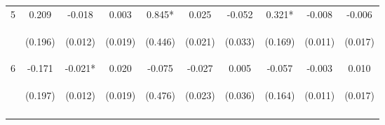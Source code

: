 \begin{tabular}{lccccccccc}
\noalign{\smallskip}5 & 0.209 & -0.018 & 0.003 & 0.845* & 0.025 & -0.052 & 0.321* & -0.008 & -0.006\\
 & \begin{footnotesize}(0.196)\end{footnotesize} & \begin{footnotesize}(0.012)\end{footnotesize} & \begin{footnotesize}(0.019)\end{footnotesize} & \begin{footnotesize}(0.446)\end{footnotesize} & \begin{footnotesize}(0.021)\end{footnotesize} & \begin{footnotesize}(0.033)\end{footnotesize} & \begin{footnotesize}(0.169)\end{footnotesize} & \begin{footnotesize}(0.011)\end{footnotesize} & \begin{footnotesize}(0.017)\end{footnotesize}\\
\noalign{\smallskip}6 & -0.171 & -0.021* & 0.020 & -0.075 & -0.027 & 0.005 & -0.057 & -0.003 & 0.010\\
 & \begin{footnotesize}(0.197)\end{footnotesize} & \begin{footnotesize}(0.012)\end{footnotesize} & \begin{footnotesize}(0.019)\end{footnotesize} & \begin{footnotesize}(0.476)\end{footnotesize} & \begin{footnotesize}(0.023)\end{footnotesize} & \begin{footnotesize}(0.036)\end{footnotesize} & \begin{footnotesize}(0.164)\end{footnotesize} & \begin{footnotesize}(0.011)\end{footnotesize} & \begin{footnotesize}(0.017)\end{footnotesize}\\
\noalign{\smallskip}\hline\end{tabular}\\
